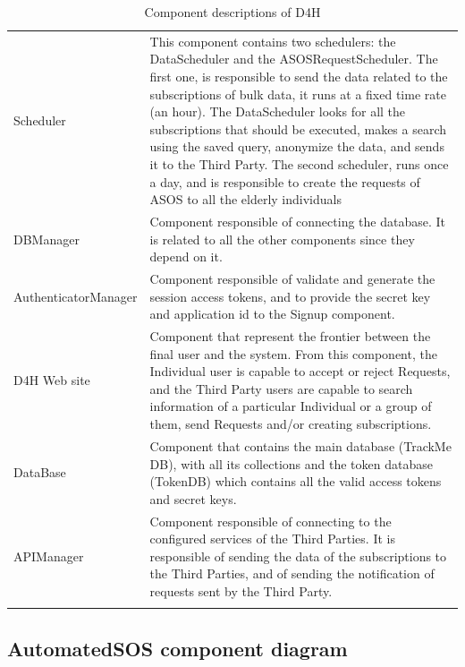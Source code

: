 \documentclass[a4paper, hidelinks, 12pt]{report}
\begin{document}
\begin{longtable}{l p{}}
			Scheduler & This component contains two schedulers: the DataScheduler and the ASOSRequestScheduler. The first one, is responsible to send the data related to the subscriptions of bulk data, it runs at a fixed time rate (an hour). The DataScheduler looks for all the subscriptions that should be executed, makes a search using the saved query, anonymize the data, and sends it to the Third Party. The second scheduler, runs once a day, and is responsible to create the requests of ASOS to all the elderly individuals\\
			
			DBManager & Component responsible of connecting the database. It is related to all the other components since they depend on it.\\
			
			AuthenticatorManager & Component responsible of validate and generate the session access tokens, and to provide the secret key and application id to the Signup component.\\
			
			D4H Web site & Component that represent the frontier between the final user and the system. From this component, the Individual user is capable to accept or reject Requests, and the Third Party users are capable to search information of a particular Individual or a group of them, send Requests and/or creating subscriptions.\\
			
			DataBase & Component that contains the main database (TrackMe DB), with all its collections and the token database (TokenDB) which contains all the valid access tokens and secret keys.\\
			
			APIManager & Component responsible of connecting to the configured services of the Third Parties. It is responsible of sending the data of the subscriptions to the Third Parties, and of sending the notification of requests sent by the Third Party.\\
			
			\hline
			\caption{Component descriptions of D4H}
			\label{table:d4h_component_descriptions}
		\end{longtable}
			
			\subsection{AutomatedSOS component diagram}
\end{document}
